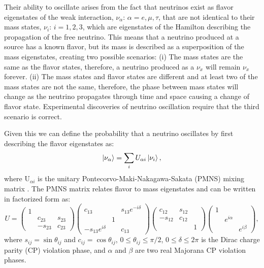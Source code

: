 Their ability to oscillate arises from the fact that neutrinos exist as flavor eigenstates of the weak interaction, $\nu_\alpha$: $\alpha = e, \mu, \tau$, that are not identical to their mass states, $\nu_i$: $i = 1, 2, 3$, which are eigenstates of the Hamilton describing the propagation of the free neutrino.
This means that a neutrino produced at a source has a known flavor, but its mass is described as a superposition of the mass eigenstates, creating two possible scenarios:
(i) The mass states are the same as the flavor states, therefore, a neutrino produced as a $\nu_x$ will remain $\nu_x$ forever. 
(ii) The mass states and flavor states are different and at least two of the mass states are not the same, therefore, the phase between mass states will change as the neutrino propagates through time and space causing a change of flavor state.
Experimental discoveries of neutrino oscillation require that the third scenario is correct.

Given this we can define the probability that a neutrino oscillates by first describing the flavor eigenstates as:
\begin{equation}
	\ket{\nu_\alpha} = \sum_{i}U_{\alpha i}\ket{\nu_i},
\end{equation}
where U$_{\alpha i}$ is the unitary Pontecorvo-Maki-Nakagawa-Sakata (PMNS) mixing matrix \cite{PDG}. 
The PMNS matrix relates flavor to mass eigenstates and can be written in factorized form as:
\begin{equation}	
	U = 
	\begin{pmatrix}
		1 & & \\
		& c_{23} & s_{23} \\
		& -s_{23} & c_{23}
	\end{pmatrix}
	\begin{pmatrix}
		c_{13} & & s_{13}e^{-i\delta} \\
		& 1 &	\\
		-s_{13}e^{i\delta} & & c_{13}
	\end{pmatrix}
	\begin{pmatrix}
		c_{12} & s_{12} & \\
		-s_{12} & c_{12} & \\
		& & 1
	\end{pmatrix}
	\begin{pmatrix}
		1 & & \\
		& e^{i\alpha}  & \\
		& & e^{i\beta}
	\end{pmatrix},
\end{equation}
where $s_{ij} = \sin\theta_{ij}$ and $c_{ij} = \cos\theta_{ij}$, $0 \leq \theta_{ij} \leq \pi/2$, $0 \leq \delta \leq 2\pi$ is the Dirac charge parity (CP) violation phase, and $\alpha$ and $\beta$ are two real Majorana CP violation phases.

